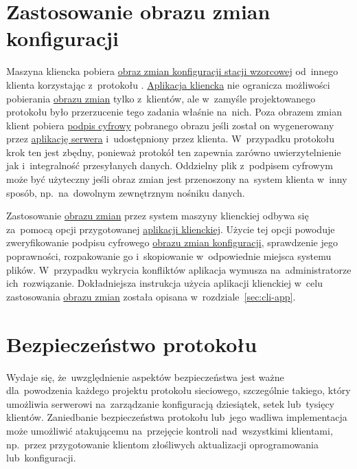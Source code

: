 \documentclass[thesis]{subfiles}
\begin{document}
\section{Zastosowanie obrazu zmian konfiguracji}
\label{sec:zastosowanie-obrazu-konfiguracji}

Maszyna kliencka pobiera \hyperref[sec:obraz-zmian-konfiguracji]{obraz zmian konfiguracji stacji wzorcowej} od~innego klienta korzystając z~protokołu \sftp{}. \hyperref[sec:cli-app]{Aplikacja kliencka} nie ogranicza możliwości pobierania \hyperref[sec:obraz-zmian-konfiguracji]{obrazu zmian} tylko z~klientów, ale w~zamyśle projektowanego protokołu było przerzucenie tego zadania właśnie na~nich. Poza obrazem zmian klient pobiera \href{https://superuser.com/a/426345/139893}{podpis cyfrowy} pobranego obrazu jeśli został on wygenerowany przez \hyperref[sec:srv-app]{aplikację serwera} i~udostępniony przez klienta. W~przypadku protokołu \sftp{} krok ten jest zbędny, ponieważ protokół ten zapewnia zarówno uwierzytelnienie jak i~integralność przesyłanych danych. Oddzielny plik z~podpisem cyfrowym może być użyteczny jeśli obraz zmian jest przenoszony na~system klienta w~inny sposób, np.~na~dowolnym zewnętrznym nośniku danych.

Zastosowanie \hyperref[sec:obraz-zmian-konfiguracji]{obrazu zmian} przez system maszyny klienckiej odbywa się za~pomocą opcji  przygotowanej \hyperref[sec:cli-app]{aplikacji klienckiej}. Użycie tej opcji powoduje zweryfikowanie podpisu cyfrowego \hyperref[sec:obraz-zmian-konfiguracji]{obrazu zmian konfiguracji}, sprawdzenie jego poprawności, rozpakowanie go i~skopiowanie w~odpowiednie miejsca systemu plików. W~przypadku wykrycia konfliktów aplikacja wymusza na~administratorze ich~rozwiązanie. Dokładniejsza instrukcja użycia aplikacji klienckiej w~celu zastosowania \hyperref[sec:obraz-zmian-konfiguracji]{obrazu zmian} została opisana w~rozdziale~\ref{sec:cli-app}.


\section{Bezpieczeństwo protokołu}
\label{sec:security}

Wydaje się, że~uwzględnienie aspektów bezpieczeństwa jest ważne dla~powodzenia każdego projektu protokołu sieciowego, szczególnie takiego, który umożliwia serwerowi na~zarządzanie konfiguracją dziesiątek, setek lub~tysięcy klientów. Zaniedbanie bezpieczeństwa protokołu lub~jego wadliwa implementacja może umożliwić atakującemu na~przejęcie kontroli nad~wszystkimi klientami, np.~przez przygotowanie klientom złośliwych aktualizacji oprogramowania lub~konfiguracji.
\end{document}
